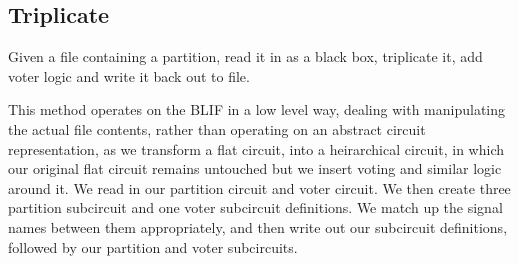 \documentclass[12pt,final,oneside]{dwThesis} %
\begin{document}
   \subsection{Triplicate}\label{algTriplicate} Given a file containing a
   partition, read it in as a black box, triplicate it, add voter logic and
   write it back out to file.

   This method operates on the \gls{BLIF} in a low level way, dealing with
   manipulating the actual file contents, rather than operating on an abstract
   circuit representation, as we transform a flat circuit, into a heirarchical
   circuit, in which our original flat circuit remains untouched but we insert
   voting and similar logic around it.  We read in our partition circuit and
   voter circuit. We then create three partition subcircuit and one voter
   subcircuit definitions. We match up the signal names between them
   appropriately, and then write out our subcircuit definitions, followed by
   our partition and voter subcircuits.
\end{document}
